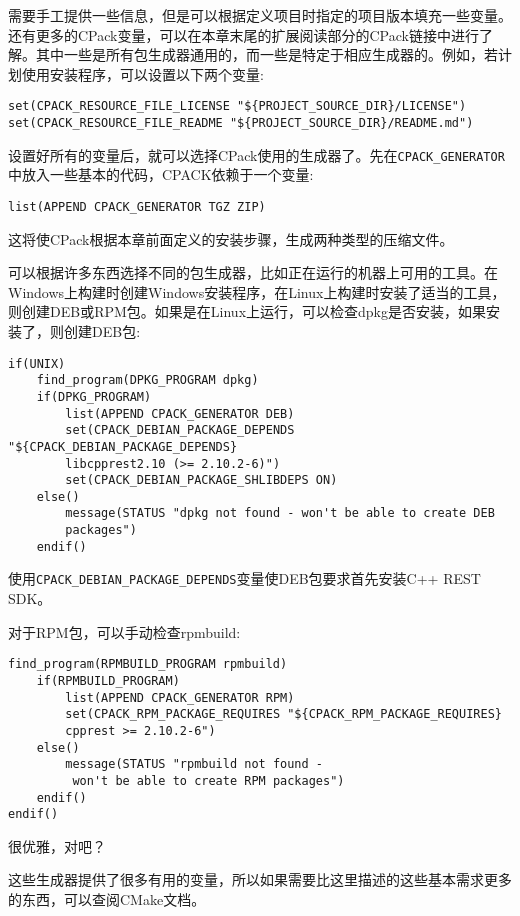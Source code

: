 需要手工提供一些信息，但是可以根据定义项目时指定的项目版本填充一些变量。还有更多的CPack变量，可以在本章末尾的扩展阅读部分的CPack链接中进行了解。其中一些是所有包生成器通用的，而一些是特定于相应生成器的。例如，若计划使用安装程序，可以设置以下两个变量:

\begin{lstlisting}[style=styleCMake]
set(CPACK_RESOURCE_FILE_LICENSE "${PROJECT_SOURCE_DIR}/LICENSE")
set(CPACK_RESOURCE_FILE_README "${PROJECT_SOURCE_DIR}/README.md")
\end{lstlisting}

设置好所有的变量后，就可以选择CPack使用的生成器了。先在\texttt{CPACK\_GENERATOR}中放入一些基本的代码，CPACK依赖于一个变量:

\begin{lstlisting}[style=styleCMake]
list(APPEND CPACK_GENERATOR TGZ ZIP)
\end{lstlisting}

这将使CPack根据本章前面定义的安装步骤，生成两种类型的压缩文件。

可以根据许多东西选择不同的包生成器，比如正在运行的机器上可用的工具。在Windows上构建时创建Windows安装程序，在Linux上构建时安装了适当的工具，则创建DEB或RPM包。如果是在Linux上运行，可以检查dpkg是否安装，如果安装了，则创建DEB包:

\begin{lstlisting}[style=styleCMake]
if(UNIX)
	find_program(DPKG_PROGRAM dpkg)
	if(DPKG_PROGRAM)
		list(APPEND CPACK_GENERATOR DEB)
		set(CPACK_DEBIAN_PACKAGE_DEPENDS "${CPACK_DEBIAN_PACKAGE_DEPENDS}
		libcpprest2.10 (>= 2.10.2-6)")
		set(CPACK_DEBIAN_PACKAGE_SHLIBDEPS ON)
	else()
		message(STATUS "dpkg not found - won't be able to create DEB
		packages")
	endif()
\end{lstlisting}

使用\texttt{CPACK\_DEBIAN\_PACKAGE\_DEPENDS}变量使DEB包要求首先安装C++ REST SDK。

对于RPM包，可以手动检查rpmbuild:

\begin{lstlisting}[style=styleCMake]
	find_program(RPMBUILD_PROGRAM rpmbuild)
	if(RPMBUILD_PROGRAM)
		list(APPEND CPACK_GENERATOR RPM)
		set(CPACK_RPM_PACKAGE_REQUIRES "${CPACK_RPM_PACKAGE_REQUIRES} 
		cpprest >= 2.10.2-6")
	else()
		message(STATUS "rpmbuild not found -
		 won't be able to create RPM packages")
	endif()
endif()
\end{lstlisting}

很优雅，对吧？

这些生成器提供了很多有用的变量，所以如果需要比这里描述的这些基本需求更多的东西，可以查阅CMake文档。


